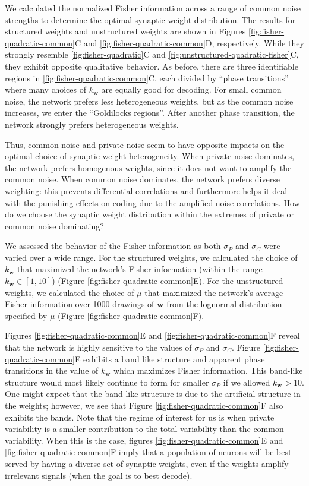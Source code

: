 \documentclass[12pt]{article}
\begin{document}
We calculated the normalized Fisher information across a range of common noise strengths to determine the optimal synaptic weight distribution. The results for structured weights and unstructured weights are shown in Figures \ref{fig:fisher-quadratic-common}C and \ref{fig:fisher-quadratic-common}D, respectively. While they strongly resemble \ref{fig:fisher-quadratic}C and \ref{fig:unstructured-quadratic-fisher}C, they exhibit opposite qualitative behavior. As before, there are three identifiable regions in \ref{fig:fisher-quadratic-common}C, each divided by ``phase transitions'' where many choices of $k_{\mathbf{w}}$ are equally good for decoding. For small common noise, the network prefers less heterogeneous weights, but as the common noise increases, we enter the ``Goldilocks regions''. After another phase transition, the network strongly prefers heterogeneous weights. 

Thus, common noise and private noise seem to have opposite impacts on the optimal choice of synaptic weight heterogeneity. When private noise dominates, the network prefers homogenous weights, since it does not want to amplify the common noise. When common noise dominates, the network prefers diverse weighting: this prevents differential correlations and furthermore helps it deal with the punishing effects on coding due to the amplified noise correlations. How do we choose the synaptic weight distribution within the extremes of private or common noise dominating? 

We assessed the behavior of the Fisher information as both $\sigma_P$ and $\sigma_C$ were varied over a wide range. For the structured weights, we calculated the choice of $k_{\mathbf{w}}$ that maximized the network's Fisher information (within the range $k_{\mathbf{w}} \in [1, 10]$) (Figure \ref{fig:fisher-quadratic-common}E). For the unstructured weights, we calculated the choice of $\mu$ that maximized the network's average Fisher information over 1000 drawings of $\mathbf{w}$ from the lognormal distribution specified by $\mu$ (Figure \ref{fig:fisher-quadratic-common}F).

Figures \ref{fig:fisher-quadratic-common}E and \ref{fig:fisher-quadratic-common}F reveal that the network is highly sensitive to the values of $\sigma_P$ and $\sigma_C$. Figure \ref{fig:fisher-quadratic-common}E exhibits a band like structure and apparent phase transitions in the value of $k_{\mathbf{w}}$ which maximizes Fisher information. This band-like structure would most likely continue to form for smaller $\sigma_P$ if we allowed $k_{\mathbf{w}}>10$. One might expect that the band-like structure is due to the artificial structure in the weights; however, we see that Figure \ref{fig:fisher-quadratic-common}F also exhibits the bands. Note that the regime of interest for us is when private variability is a smaller contribution to the total variability than the common variability. When this is the case, figures \ref{fig:fisher-quadratic-common}E and \ref{fig:fisher-quadratic-common}F imply that a population of neurons will be best served by having a diverse set of synaptic weights, even if the weights amplify irrelevant signals (when the goal is to best decode).
\end{document}
